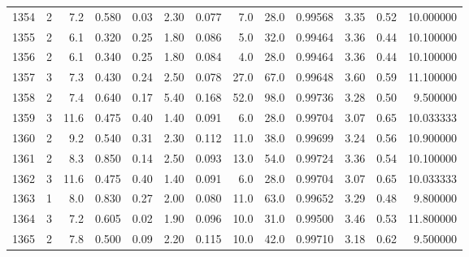 \begin{tabular}{lrrrrrrrrrrrr}
1354 &        2 &            7.2 &             0.580 &         0.03 &            2.30 &      0.077 &                  7.0 &                  28.0 &  0.99568 &  3.35 &       0.52 &  10.000000 \\
1355 &        2 &            6.1 &             0.320 &         0.25 &            1.80 &      0.086 &                  5.0 &                  32.0 &  0.99464 &  3.36 &       0.44 &  10.100000 \\
1356 &        2 &            6.1 &             0.340 &         0.25 &            1.80 &      0.084 &                  4.0 &                  28.0 &  0.99464 &  3.36 &       0.44 &  10.100000 \\
1357 &        3 &            7.3 &             0.430 &         0.24 &            2.50 &      0.078 &                 27.0 &                  67.0 &  0.99648 &  3.60 &       0.59 &  11.100000 \\
1358 &        2 &            7.4 &             0.640 &         0.17 &            5.40 &      0.168 &                 52.0 &                  98.0 &  0.99736 &  3.28 &       0.50 &   9.500000 \\
1359 &        3 &           11.6 &             0.475 &         0.40 &            1.40 &      0.091 &                  6.0 &                  28.0 &  0.99704 &  3.07 &       0.65 &  10.033333 \\
1360 &        2 &            9.2 &             0.540 &         0.31 &            2.30 &      0.112 &                 11.0 &                  38.0 &  0.99699 &  3.24 &       0.56 &  10.900000 \\
1361 &        2 &            8.3 &             0.850 &         0.14 &            2.50 &      0.093 &                 13.0 &                  54.0 &  0.99724 &  3.36 &       0.54 &  10.100000 \\
1362 &        3 &           11.6 &             0.475 &         0.40 &            1.40 &      0.091 &                  6.0 &                  28.0 &  0.99704 &  3.07 &       0.65 &  10.033333 \\
1363 &        1 &            8.0 &             0.830 &         0.27 &            2.00 &      0.080 &                 11.0 &                  63.0 &  0.99652 &  3.29 &       0.48 &   9.800000 \\
1364 &        3 &            7.2 &             0.605 &         0.02 &            1.90 &      0.096 &                 10.0 &                  31.0 &  0.99500 &  3.46 &       0.53 &  11.800000 \\
1365 &        2 &            7.8 &             0.500 &         0.09 &            2.20 &      0.115 &                 10.0 &                  42.0 &  0.99710 &  3.18 &       0.62 &   9.500000 \\

\end{tabular}
